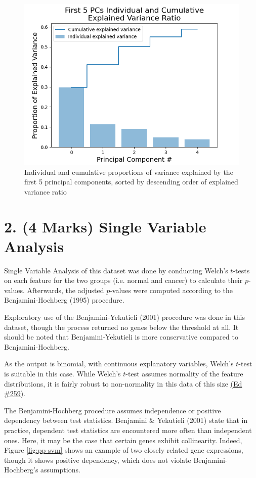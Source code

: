 \documentclass[twocolumn]{article}
\begin{document}
\begin{figure}[H]
    \centering
    \includegraphics[width=\linewidth]{figures/PCA_Top_5_Explained_Variance_Curve.png}
    \caption{Individual and cumulative proportions of variance explained by the first 5 principal components, sorted by descending order of explained variance ratio}
    \label{fig:pc-variance-first-5}
\end{figure}


\section{2. (4 Marks) Single Variable Analysis}
Single Variable Analysis of this dataset was done by conducting Welch's $t$-tests on each feature for the two groups (i.e. normal and cancer) to calculate their $p$-values. Afterwards, the adjusted $p$-values were computed according to the Benjamini-Hochberg (1995) \cite{BenjaminiHochberg1995} procedure.

Exploratory use of the Benjamini-Yekutieli (2001) procedure was done in this dataset, though the process returned no genes below the threshold at all. It should be noted that Benjamini-Yekutieli is more conservative compared to Benjamini-Hochberg.

As the output is binomial, with continuous explanatory variables, Welch's $t$-test is suitable in this case. While Welch's $t$-test assumes normality of the feature distributions, it is fairly robust to non-normality in this data of this size \href{https://edstem.org/au/courses/13108/discussion/1697987}{(Ed \#259)}.

The Benjamini-Hochberg procedure assumes independence or positive dependency between test statistics. Benjamini \& Yekutieli (2001) \cite{BenjaminiYekutieli2001} state that in practice, dependent test statistics are encountered more often than independent ones. Here, it may be the case that certain genes exhibit collinearity. Indeed, Figure \ref{fig:pp-svm} shows an example of two closely related gene expressions, though it shows positive dependency, which does not violate Benjamini-Hochberg's assumptions.
\end{document}
